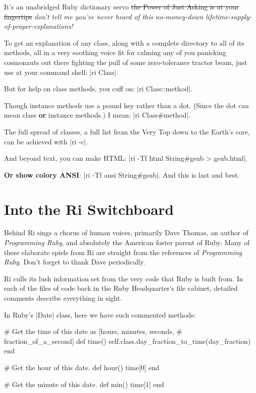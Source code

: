 \documentclass[12pt,twoside]{report}
\begin{document}
It's an unabridged Ruby dictionary servo \sout{the Power of Just Asking is
at your fingertips} \emph{don't tell me you've never heard of this
no-money-down lifetime-supply-of-proper-explanations!}

To get an explanation of any class, along with a complete directory to
all of its methods, all in a very soothing voice fit for calming any
of you panicking cosmonauts out there fighting the pull of some
zero-tolerance tractor beam, just use at your command shell: 
\consoleinline|ri Class|.

But for help on class methods, you cuff on: 
\consoleinline|ri Class::method|.

Though instance methods use a pound key rather than a dot. (Since the
dot can mean class \textbf{or} instance methods.) I mean: 
\consoleinline|ri Class#method|.

The full spread of classes, a full list from the Very Top down to the
Earth's core, can be achieved with \consoleinline|ri -c|.

And beyond text, you can make HTML: 
\consoleinline|ri -Tf html String#gsub > gsub.html|.

\textbf{Or show colory ANSI}: 
\consoleinline|ri -Tf ansi String#gsub|. And this is
last and best.

\section{Into the Ri Switchboard}

Behind Ri sings a chorus of human voices, primarily Dave Thomas, an
author of \emph{Programming Ruby}, and absolutely the American foster parent
of Ruby. Many of these elaborate spiels from Ri are straight from the
references of \emph{Programming Ruby}. Don't forget to thank Dave
periodically.

Ri culls its lush information set from the very code that Ruby is
built from. In each of the files of code back in the Ruby
Headquarter's file cabinet, detailed comments describe everything in
sight.

In Ruby's \rubyinline|Date| class, here we have such commented methods:

\begin{rubycode}
 # Get the time of this date as [hours, minutes, seconds,
 # fraction_of_a_second]
 def time() self.class.day_fraction_to_time(day_fraction) end

 # Get the hour of this date.
 def hour() time[0] end

 # Get the minute of this date.
 def min() time[1] end
\end{rubycode}
\end{document}
